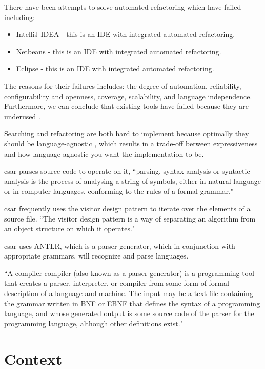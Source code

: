 \documentclass[12pt, letterpaper]{article}
\begin{document}
There have been attempts to solve automated refactoring which have failed including:
\begin{itemize}
  \item IntelliJ IDEA - this is an IDE with integrated automated refactoring.
  \item Netbeans - this is an IDE with integrated automated refactoring.
  \item Eclipse - this is an IDE with integrated automated refactoring.
\end{itemize}

The reasons for their failures includes: the degree of automation, reliability, configurability and openness, coverage, scalability, and language independence. \autocite{mens2004survey} Furthermore, we can conclude that existing tools have failed because they are underused \autocite{murphy2012we}.

Searching and refactoring are both hard to implement because optimally they should be language-agnostic \autocite{mens2004survey,reiss2009semantics}, which results in a trade-off between expressiveness and how language-agnostic you want the implementation to be.

csar parses source code to operate on it, ``parsing, syntax analysis or syntactic analysis is the process of analysing a string of symbols, either in natural language or in computer languages, conforming to the rules of a formal grammar." \autocite{wikipediaparsing}

csar frequently uses the visitor design pattern to iterate over the elements of a source file.
``The visitor design pattern is a way of separating an algorithm from an object structure on which it operates." \autocite{wikipediavisitorpattern}

csar uses ANTLR, which is a parser-generator, which in conjunction with appropriate grammars, will recognize and parse languages.

``A compiler-compiler (also known as a parser-generator) is a programming tool that creates a parser, interpreter, or compiler from some form of formal description of a language and machine. The input may be a text file containing the grammar written in BNF or EBNF that defines the syntax of a programming language, and whose generated output is some source code of the parser for the programming language, although other definitions exist." \autocite{wikipediacompilercompiler}

\section{Context}
\end{document}
